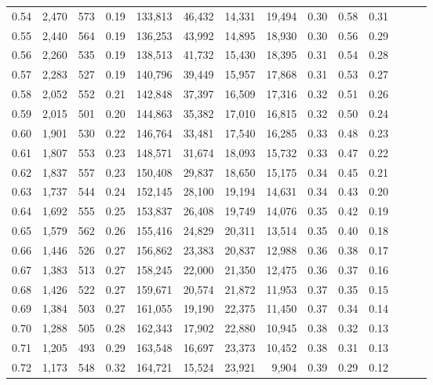\begin{tabular}{rrrrrrrrrrrrrr}
0.54 &  2,470 &  573 &  0.19 &  133,813 &   46,432 &  14,331 &  19,494 &  0.30 &  0.58 &      0.31 \\
0.55 &  2,440 &  564 &  0.19 &  136,253 &   43,992 &  14,895 &  18,930 &  0.30 &  0.56 &      0.29 \\
0.56 &  2,260 &  535 &  0.19 &  138,513 &   41,732 &  15,430 &  18,395 &  0.31 &  0.54 &      0.28 \\
0.57 &  2,283 &  527 &  0.19 &  140,796 &   39,449 &  15,957 &  17,868 &  0.31 &  0.53 &      0.27 \\
0.58 &  2,052 &  552 &  0.21 &  142,848 &   37,397 &  16,509 &  17,316 &  0.32 &  0.51 &      0.26 \\
0.59 &  2,015 &  501 &  0.20 &  144,863 &   35,382 &  17,010 &  16,815 &  0.32 &  0.50 &      0.24 \\
0.60 &  1,901 &  530 &  0.22 &  146,764 &   33,481 &  17,540 &  16,285 &  0.33 &  0.48 &      0.23 \\
0.61 &  1,807 &  553 &  0.23 &  148,571 &   31,674 &  18,093 &  15,732 &  0.33 &  0.47 &      0.22 \\
0.62 &  1,837 &  557 &  0.23 &  150,408 &   29,837 &  18,650 &  15,175 &  0.34 &  0.45 &      0.21 \\
0.63 &  1,737 &  544 &  0.24 &  152,145 &   28,100 &  19,194 &  14,631 &  0.34 &  0.43 &      0.20 \\
0.64 &  1,692 &  555 &  0.25 &  153,837 &   26,408 &  19,749 &  14,076 &  0.35 &  0.42 &      0.19 \\
0.65 &  1,579 &  562 &  0.26 &  155,416 &   24,829 &  20,311 &  13,514 &  0.35 &  0.40 &      0.18 \\
0.66 &  1,446 &  526 &  0.27 &  156,862 &   23,383 &  20,837 &  12,988 &  0.36 &  0.38 &      0.17 \\
0.67 &  1,383 &  513 &  0.27 &  158,245 &   22,000 &  21,350 &  12,475 &  0.36 &  0.37 &      0.16 \\
0.68 &  1,426 &  522 &  0.27 &  159,671 &   20,574 &  21,872 &  11,953 &  0.37 &  0.35 &      0.15 \\
0.69 &  1,384 &  503 &  0.27 &  161,055 &   19,190 &  22,375 &  11,450 &  0.37 &  0.34 &      0.14 \\
0.70 &  1,288 &  505 &  0.28 &  162,343 &   17,902 &  22,880 &  10,945 &  0.38 &  0.32 &      0.13 \\
0.71 &  1,205 &  493 &  0.29 &  163,548 &   16,697 &  23,373 &  10,452 &  0.38 &  0.31 &      0.13 \\
0.72 &  1,173 &  548 &  0.32 &  164,721 &   15,524 &  23,921 &   9,904 &  0.39 &  0.29 &      0.12 \\

\end{tabular}
